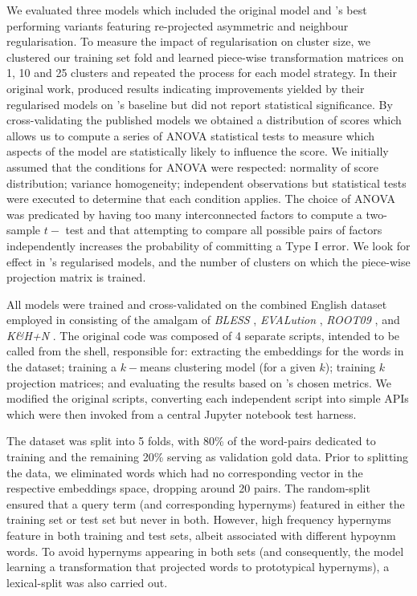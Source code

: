 We evaluated three models which included the original \citep{Fu2014} model and \citeauthor{ustalov2017negative}'s best performing variants featuring re-projected asymmetric and neighbour regularisation.  To measure the impact of regularisation on cluster size, we clustered our training set fold and learned piece-wise transformation matrices on 1, 10 and 25 clusters and repeated the process for each model strategy.  In their original work, \citeauthor{ustalov2017negative} produced results indicating improvements yielded by their regularised models on \citeauthor{Fu2014}'s baseline but did not report statistical significance.  By cross-validating the published models we obtained a distribution of scores which allows us to compute a series of \ac{ANOVA} statistical tests to measure which aspects of the model are statistically likely to influence the score.  We initially assumed that the conditions for \ac{ANOVA} were respected: normality of score distribution; variance homogeneity; independent observations but statistical tests were executed to determine that each condition applies.  The choice of \ac{ANOVA} was predicated by having too many interconnected factors to compute a two-sample $t-$ test and that attempting to compare all possible pairs of factors independently increases the probability of committing a Type I error. %
We look for effect in \citeauthor{ustalov2017negative}'s regularised models, and the number of clusters on which the piece-wise projection matrix is trained. 

All models were trained and cross-validated on the combined English dataset employed in \citep{ustalov2017negative} consisting of the amalgam of \textit{BLESS} \citep{Baroni2011}, \textit{EVALution} \citep{santus2015evalution}, \textit{ROOT09} \citep{santus2016nine}, and \textit{K\&H+N} \citep{necsulescu2015reading}.  The original code was composed of 4 separate scripts, intended to be called from the shell, responsible for: extracting the embeddings for the words in the dataset; training a $k-$means clustering model (for a given $k$); training $k$ projection matrices; and evaluating the results based on \citeauthor{ustalov2017negative}'s chosen metrics.  We modified the original scripts, converting each independent script into simple APIs which were then invoked from a central Jupyter notebook test harness.

The dataset was split into 5 folds, with 80\% of the word-pairs dedicated to training and the remaining 20\% serving as validation gold data.  Prior to splitting the data, we eliminated words which had no corresponding vector in the respective embeddings space, dropping around 20 pairs.  The random-split ensured that a query term (and corresponding hypernyms) featured in either the training set or test set but never in both.  However, high frequency hypernyms feature in both training and test sets, albeit associated with different hypoynm words.  To avoid hypernyms appearing in both sets (and consequently, the model learning a transformation that projected words to prototypical hypernyms), a lexical-split was also carried out.

